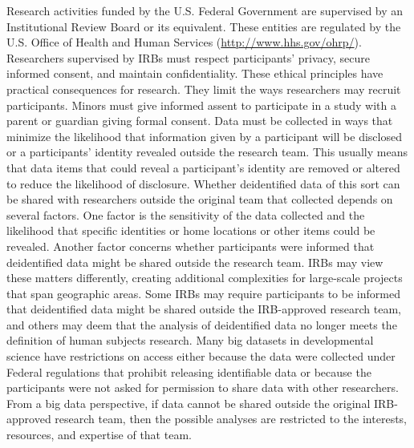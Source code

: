 \documentclass[letterpaper,man,apacite,natbib]{apa6}
\begin{document}
Research activities funded by the U.S. Federal Government are supervised by an Institutional Review Board or its equivalent.
These entities are regulated by the U.S. Office of Health and Human Services (\url{http://www.hhs.gov/ohrp/}).
Researchers supervised by IRBs must respect participants' privacy, secure informed consent, and maintain confidentiality. 
These ethical principles have practical consequences for research.
They limit the ways researchers may recruit participants.
Minors must give informed assent to participate in a study with a parent or guardian giving formal consent.
Data must be collected in ways that minimize the likelihood that information given by a participant will be disclosed or a participants' identity revealed outside the research team.
This usually means that data items that could reveal a participant's identity are removed or altered to reduce the likelihood of disclosure.
Whether deidentified data of this sort can be shared with researchers outside the original team that collected depends on several factors.
One factor is the sensitivity of the data collected and the likelihood that specific identities or home locations or other items could be revealed.
Another factor concerns whether participants were informed that deidentified data might be shared outside the research team.
IRBs may view these matters differently, creating additional complexities for large-scale projects that span geographic areas.
Some IRBs may require participants to be informed that deidentified data might be shared outside the IRB-approved research team, and others may deem that the analysis of deidentified data no longer meets the definition of human subjects research.
Many big datasets in developmental science have restrictions on access either because the data were collected under Federal regulations that prohibit releasing identifiable data or because the participants were not asked for permission to share data with other researchers.
From a big data perspective, if data cannot be shared outside the original IRB-approved research team, then the possible analyses are restricted to the interests, resources, and expertise of that team.
\end{document}
